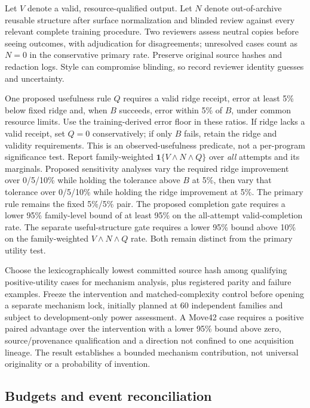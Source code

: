 Let $V$ denote a valid, resource-qualified output. Let $N$ denote out-of-archive
reusable structure after surface normalization and blinded review against every
relevant complete training procedure. Two reviewers assess neutral copies before
seeing outcomes, with adjudication for disagreements; unresolved cases count as
$N=0$ in the conservative primary rate. Preserve original source hashes and
redaction logs. Style can compromise blinding, so record reviewer identity
guesses and uncertainty.

One proposed usefulness rule $Q$ requires a valid ridge receipt, error at least
5\% below fixed ridge and, when $B$ succeeds, error within 5\% of $B$, under
common resource limits. Use the training-derived error floor in these ratios.
If ridge lacks a valid receipt, set $Q=0$ conservatively; if only $B$ fails, retain
the ridge and validity requirements. This is an observed-usefulness predicate,
not a per-program significance test. Report family-weighted
$\mathbf{1}\{V\land N\land Q\}$ over \emph{all} attempts and its marginals.
Proposed sensitivity analyses vary the required ridge improvement over
0/5/10\% while holding the tolerance above $B$ at 5\%, then vary that tolerance
over 0/5/10\% while holding the ridge improvement at 5\%. The primary rule
remains the fixed 5\%/5\% pair. The proposed completion gate requires a lower
95\% family-level bound of at least 95\% on the all-attempt valid-completion
rate. The separate useful-structure gate requires a lower 95\% bound above
10\% on the family-weighted $V\land N\land Q$ rate. Both remain distinct from
the primary utility test.

Choose the lexicographically lowest committed source hash among qualifying
positive-utility cases for mechanism analysis, plus registered parity and failure
examples. Freeze the intervention and matched-complexity control before opening
a separate mechanism lock, initially planned at 60 independent families and
subject to development-only power assessment. A Move42 case requires a positive
paired advantage over the intervention with a lower 95\% bound above zero,
source/provenance qualification and a direction not confined to one acquisition
lineage. The result establishes a bounded mechanism contribution, not universal
originality or a probability of invention.

\subsection{Budgets and event reconciliation}

